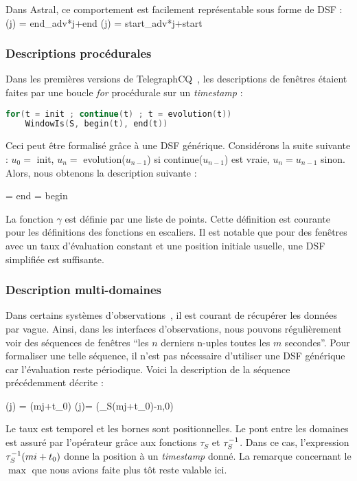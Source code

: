 Dans Astral, ce comportement est facilement représentable sous forme de DSF :
	{\beta(j) = \textrm{end\_adv}*j+\textrm{end}}
	{\alpha(j) = \textrm{start\_adv}*j+\textrm{start}}

\subsubsection{Descriptions procédurales}
Dans les premières versions de TelegraphCQ~\cite{Chandrasekaran:telegraphcq}, les descriptions de fenêtres étaient faites par une boucle \textit{for} procédurale sur un \textit{timestamp} :
\begin{lstlisting}[language=C]
for(t = init ; continue(t) ; t = evolution(t))
	WindowIs(S, begin(t), end(t))
\end{lstlisting}

Ceci peut être formalisé grâce à une DSF générique. Considérons la suite suivante : $u_0=$ init, $u_n=$ evolution($u_{n-1}$) si continue($u_{n-1}$) est vraie, $u_n = u_{n-1}$ sinon. Alors, nous obtenons la description suivante :

\DSF{\gamma(t,i) = \displaystyle\sum_{i=0}^{+\infty} u_i \indic_{[u_i, u_{i+1}[}(t)}
	{\beta = \textrm{end}}
	{\alpha = \textrm{begin}}

La fonction $\gamma$ est définie par une liste de points. Cette définition est courante pour les définitions des fonctions en escaliers. Il est notable que pour des fenêtres avec un taux d'évaluation constant et une position initiale usuelle, une DSF simplifiée est suffisante. 
\subsubsection{Description multi-domaines}
Dans certains systèmes d'observations~\cite{Jurdak:sumac}, il est courant de récupérer les données par vague. Ainsi, dans les interfaces d'observations, nous pouvons régulièrement voir des séquences de fenêtres \enquote{les $n$ derniers n-uples toutes les $m$ secondes}. Pour formaliser une telle séquence, il n'est pas nécessaire d'utiliser une DSF générique car l'évaluation reste périodique. Voici la description de la séquence précédemment décrite :

	{\beta(j) = \rtau(mj+t_0)}
	{\alpha(j)= \max(\rtau_S(mj+t_0)-n,0)}

Le taux est temporel et les bornes sont positionnelles. Le pont entre les domaines est assuré par l'opérateur grâce aux fonctions $\tau_S$ et $\tau^{-1}_S$. Dans ce cas, l'expression $\tau^{-1}_S(mi+t_0)$ donne la position à un \textit{timestamp} donné. La remarque concernant le $\max$ que nous avions faite plus tôt reste valable ici.

